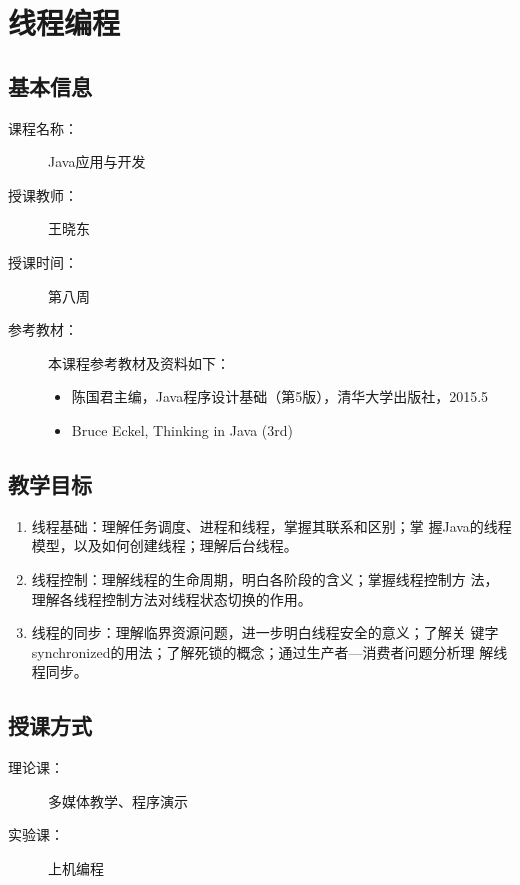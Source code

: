 \chapter{线程编程}
\label{chp:Java-thread-programming}

\section*{基本信息}
\sline
\begin{description}
\item[课程名称：] Java应用与开发
\item[授课教师：] 王晓东
\item[授课时间：] 第八周
\item[参考教材：] 本课程参考教材及资料如下：
  \begin{itemize}
  \item 陈国君主编，Java程序设计基础（第5版），清华大学出版社，2015.5
  \item Bruce Eckel, Thinking in Java (3rd)
  \end{itemize}
\end{description}

\section*{教学目标}

\sline

\begin{enumerate}
\item 线程基础：理解任务调度、进程和线程，掌握其联系和区别；掌
  握Java的线程模型，以及如何创建线程；理解后台线程。
\item 线程控制：理解线程的生命周期，明白各阶段的含义；掌握线程控制方
  法，理解各线程控制方法对线程状态切换的作用。
\item 线程的同步：理解临界资源问题，进一步明白线程安全的意义；了解关
  键字synchronized的用法；了解死锁的概念；通过生产者—消费者问题分析理
  解线程同步。
\end{enumerate}

\section*{授课方式}

\sline
\begin{description}
\item[理论课：] 多媒体教学、程序演示
\item[实验课：] 上机编程
\end{description}

